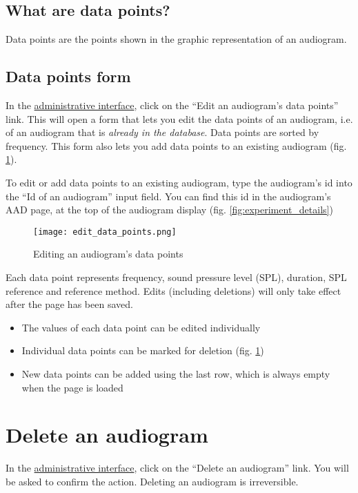 \documentclass{article}
\begin{document}
\subsection{What are data points?}
Data points are the points shown in the graphic representation of an audiogram.

\subsection{Data points form}
In the \href{https://animalaudiograms.museumfuernaturkunde.berlin/admin/v1/start}{administrative interface}, click on the ``Edit an audiogram's data points'' link. This will open a form that lets you edit the data points of an audiogram, i.e. of an audiogram that is \emph{already in the database}. Data points are sorted by frequency. This form also lets you add data points to an existing audiogram (fig. \ref{fig:edit_data_points}).

To edit or add data points to an existing audiogram, type the audiogram's id into the ``Id of an audiogram'' input field. You can find this id in the audiogram's AAD page, at the top of the audiogram display (fig. \ref{fig:experiment_details})

\begin{figure}
\texttt{[image: edit\_data\_points.png]}
\caption{Editing an audiogram's data points}
\label{fig:edit_data_points}
\end{figure}

Each data point represents frequency, sound pressure level (SPL), duration, SPL reference and reference method. Edits (including deletions) will only take effect after the page has been saved.
\begin{itemize}
\item{The values of each data point can be edited individually}
\item{Individual data points can be marked for deletion (fig. \ref{fig:edit_data_points})}
\item{New data points can be added using the last row, which is always empty when the page is loaded}
\end{itemize}


\section{Delete an audiogram}
In the \href{https://animalaudiograms.museumfuernaturkunde.berlin/admin/v1/start}{administrative interface}, click on the ``Delete an audiogram'' link. You will be asked to confirm the action. Deleting an audiogram is irreversible.
\end{document}
